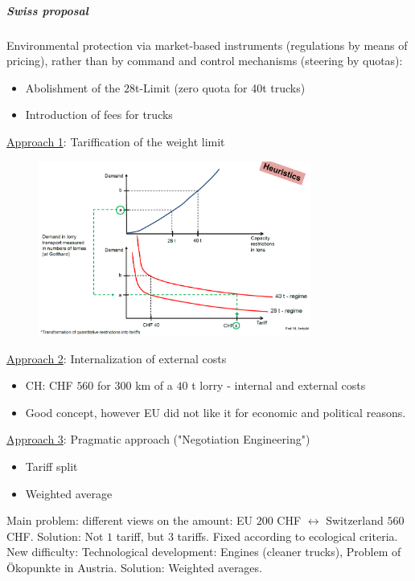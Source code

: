 \subparagraph{Swiss proposal}
Environmental protection via market-based instruments (regulations by
means of pricing), rather than by command and control mechanisms
(steering by quotas):
\begin{itemize}
    \item Abolishment of the $28$t-Limit (zero quota for 40t trucks)
    \item Introduction of fees for trucks
\end{itemize}

\underline{Approach 1}: Tariffication of the weight limit

\begin{figure}[h]
    \centering
    \includegraphics[width=0.8\textwidth]{Pictures/EU_CH_land_transport_approach_1.png}
\end{figure}

\underline{Approach 2}: Internalization of external costs
\begin{itemize}
    \item CH: CHF $560$ for $300$ km of a $40$ t lorry - internal and external costs
    \item Good concept, however EU did not like it for economic
        and political reasons.
\end{itemize}

\underline{Approach 3}: Pragmatic approach ("Negotiation Engineering")
\begin{itemize}
    \item Tariff split
    \item Weighted average
\end{itemize}


Main problem: different views on the amount: EU $200$ CHF $\leftrightarrow$
Switzerland $560$ CHF. Solution: Not $1$ tariff, but $3$ tariffs. Fixed
according to ecological criteria. New difficulty: Technological
development: Engines (cleaner trucks), Problem of Ökopunkte in Austria.
Solution: Weighted averages.

